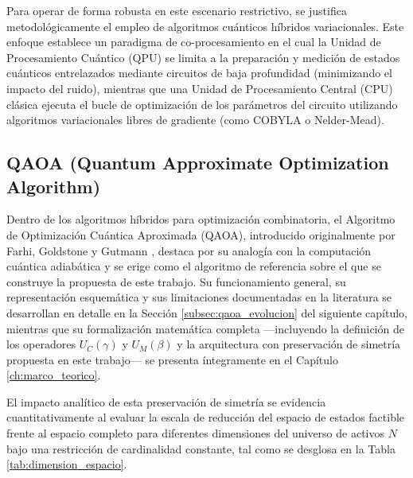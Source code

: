 Para operar de forma robusta en este escenario restrictivo, se justifica metodológicamente el empleo de algoritmos cuánticos híbridos variacionales. Este enfoque establece un paradigma de co-procesamiento en el cual la Unidad de Procesamiento Cuántico (QPU) se limita a la preparación y medición de estados cuánticos entrelazados mediante circuitos de baja profundidad (minimizando el impacto del ruido), mientras que una Unidad de Procesamiento Central (CPU) clásica ejecuta el bucle de optimización de los parámetros del circuito utilizando algoritmos variacionales libres de gradiente (como COBYLA o Nelder-Mead).

\subsection{QAOA (Quantum Approximate Optimization Algorithm)}
Dentro de los algoritmos híbridos para optimización combinatoria, el Algoritmo de Optimización Cuántica Aproximada (QAOA), introducido originalmente por Farhi, Goldstone y Gutmann \cite{Farhi2014}, destaca por su analogía con la computación cuántica adiabática y se erige como el algoritmo de referencia sobre el que se construye la propuesta de este trabajo. Su funcionamiento general, su representación esquemática y sus limitaciones documentadas en la literatura se desarrollan en detalle en la Sección \ref{subsec:qaoa_evolucion} del siguiente capítulo, mientras que su formalización matemática completa —incluyendo la definición de los operadores $U_C(\gamma)$ y $U_M(\beta)$ y la arquitectura con preservación de simetría propuesta en este trabajo— se presenta íntegramente en el Capítulo \ref{ch:marco_teorico}.

El impacto analítico de esta preservación de simetría se evidencia cuantitativamente al evaluar la escala de reducción del espacio de estados factible frente al espacio completo para diferentes dimensiones del universo de activos $N$ bajo una restricción de cardinalidad constante, tal como se desglosa en la Tabla \ref{tab:dimension_espacio}.

